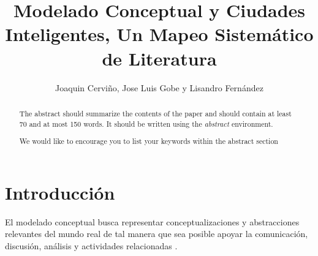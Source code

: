\documentclass[runningheads,a4paper,spanish]{llncs}
\newcommand{\keywords}[1]{\par\addvspace\baselineskip
\noindent\keywordname\enspace\ignorespaces#1}
\begin{document}
\mainmatter  %

\title{Modelado Conceptual y Ciudades Inteligentes, Un Mapeo Sistemático de Literatura}


%
%
\author{Joaquin Cerviño, Jose Luis Gobe y Lisandro Fernández}
%


%


\maketitle
\begin{abstract}
The abstract should summarize the contents of the paper and should
contain at least 70 and at most 150 words. It should be written using the
\emph{abstract} environment.
\keywords{We would like to encourage you to list your keywords within
the abstract section}
\end{abstract}


\section{Introducción}

El modelado conceptual busca representar conceptualizaciones y abstracciones
relevantes del mundo real de tal manera que sea posible apoyar la comunicación,
discusión, análisis y actividades relacionadas \cite{Delcambre2019}.
\end{document}

